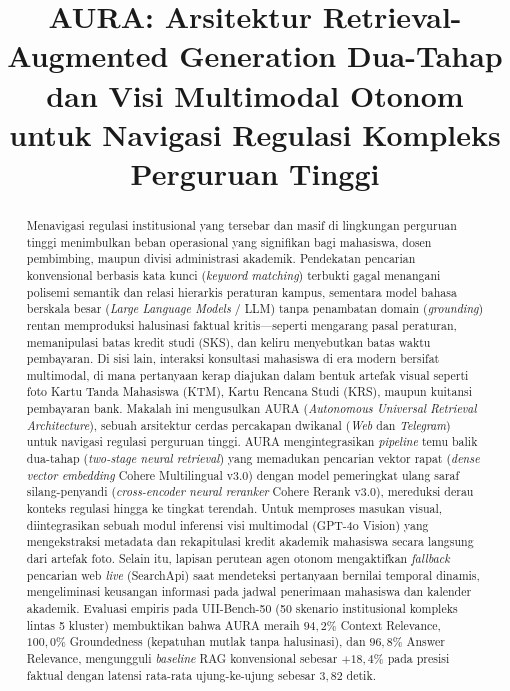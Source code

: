 \documentclass[conference]{IEEEtran}
\begin{document}
\title{AURA: Arsitektur Retrieval-Augmented Generation Dua-Tahap dan Visi Multimodal Otonom untuk Navigasi Regulasi Kompleks Perguruan Tinggi}

\author{
}

\maketitle

\begin{abstract}
Menavigasi regulasi institusional yang tersebar dan masif di lingkungan perguruan tinggi menimbulkan beban operasional yang signifikan bagi mahasiswa, dosen pembimbing, maupun divisi administrasi akademik. Pendekatan pencarian konvensional berbasis kata kunci (\textit{keyword matching}) terbukti gagal menangani polisemi semantik dan relasi hierarkis peraturan kampus, sementara model bahasa berskala besar (\textit{Large Language Models} / LLM) tanpa penambatan domain (\textit{grounding}) rentan memproduksi halusinasi faktual kritis---seperti mengarang pasal peraturan, memanipulasi batas kredit studi (SKS), dan keliru menyebutkan batas waktu pembayaran. Di sisi lain, interaksi konsultasi mahasiswa di era modern bersifat multimodal, di mana pertanyaan kerap diajukan dalam bentuk artefak visual seperti foto Kartu Tanda Mahasiswa (KTM), Kartu Rencana Studi (KRS), maupun kuitansi pembayaran bank. Makalah ini mengusulkan AURA (\textit{Autonomous Universal Retrieval Architecture}), sebuah arsitektur cerdas percakapan dwikanal (\textit{Web} dan \textit{Telegram}) untuk navigasi regulasi perguruan tinggi. AURA mengintegrasikan \textit{pipeline} temu balik dua-tahap (\textit{two-stage neural retrieval}) yang memadukan pencarian vektor rapat (\textit{dense vector embedding} Cohere Multilingual v3.0) dengan model pemeringkat ulang saraf silang-penyandi (\textit{cross-encoder neural reranker} Cohere Rerank v3.0), mereduksi derau konteks regulasi hingga ke tingkat terendah. Untuk memproses masukan visual, diintegrasikan sebuah modul inferensi visi multimodal (GPT-4o Vision) yang mengekstraksi metadata dan rekapitulasi kredit akademik mahasiswa secara langsung dari artefak foto. Selain itu, lapisan perutean agen otonom mengaktifkan \textit{fallback} pencarian web \textit{live} (SearchApi) saat mendeteksi pertanyaan bernilai temporal dinamis, mengeliminasi keusangan informasi pada jadwal penerimaan mahasiswa dan kalender akademik. Evaluasi empiris pada UII-Bench-50 (50 skenario institusional kompleks lintas 5 kluster) membuktikan bahwa AURA meraih $94{,}2\%$ Context Relevance, $100{,}0\%$ Groundedness (kepatuhan mutlak tanpa halusinasi), dan $96{,}8\%$ Answer Relevance, mengungguli \textit{baseline} RAG konvensional sebesar $+18{,}4\%$ pada presisi faktual dengan latensi rata-rata ujung-ke-ujung sebesar $3{,}82$ detik.
\end{abstract}
\end{document}

